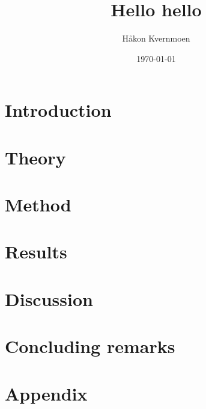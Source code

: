 \documentclass[twocolumn,english,notitlepage]{article}
\title{Hello hello}
\author{Håkon Kvernmoen}
\date{\today}
\begin{document}

\tableofcontents

\section{Introduction}


\section{Theory}


\section{Method}


\section{Results}


\section{Discussion}


\section{Concluding remarks} 



\newpage

\renewcommand{\theequation}{\thesection.\arabic{equation}}
\newpage

\section{Appendix}
\begin{appendices}
     
\end{appendices}
\end{document}
